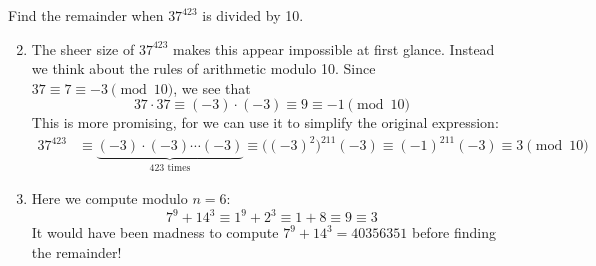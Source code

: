 \begin{examples}{}{}
	\exstart Find the remainder when $37^{423}$ is divided by 10.\vspace{-5pt}
	\begin{enumerate}\setcounter{enumi}{1}
	  \item[] The sheer size of $37^{423}$ makes this appear impossible at first glance.\footnotemark{}
	  Instead we think about the rules of arithmetic modulo 10. Since $37\equiv 7\equiv -3\pmod{10}$, we see that
		\[
			37\cdot 37\equiv (-3)\cdot(-3)\equiv 9\equiv -1\pmod{10}
		\]
		This is more promising, for we can use it to simplify the original expression:
		\begin{align*}
		37^{423}&\equiv \underbrace{(-3)\cdot(-3)\cdots(-3)}_{\text{423 times}} \equiv \bigl((-3)^2\bigr)^{211}(-3)\equiv (-1)^{211}(-3)\equiv 3\pmod{10}
		\end{align*}
	  
		
	  \item Here we compute modulo $n=6$:
	  \[
	  	7^9+14^3\equiv 1^9+2^3\equiv 1+8\equiv 9\equiv 3
	  \]
	  It would have been madness to compute $7^9+14^3=40356351$ before finding the remainder!
	  

\end{enumerate}
\end{examples}
